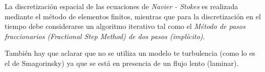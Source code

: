 \documentclass[10pt,a4paper,final]{article}
\begin{document}
%
La discretización espacial de las ecuaciones de \emph{Navier - Stokes} es realizada mediante el método de elementos finitos, mientras que para la discretización en el tiempo debe considerarse un algoritmo iterativo tal como el \emph{Método de pasos fraccionarios (Fractional Step Method) de dos pasos (implícito)}.

También hay que aclarar que no se utiliza un modelo te turbulencia (como lo es el de Smagorinsky) ya que se está en presencia de un flujo lento (laminar).
\end{document}
